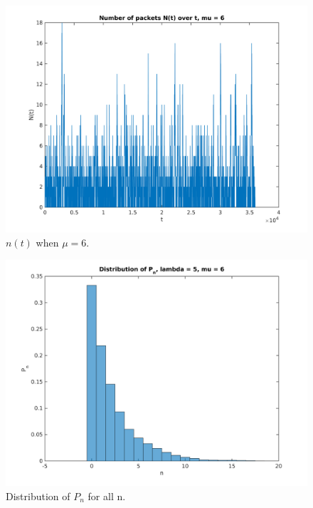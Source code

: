 \documentclass{article}
\begin{document}
		\begin{figure}[!hbt]
			\centering
			\includegraphics[width=0.5\linewidth]{hw3_3_nt_m6.png}
			\caption{$n(t)$ when $\mu = 6$.}
		\end{figure}
		\begin{figure}[!hbt]
			\centering
			\includegraphics[width=0.5\linewidth]{hw3_3_pn_l5m6.png}
			\caption{Distribution of $P_n$ for all n.}
		\end{figure}
\end{document}
